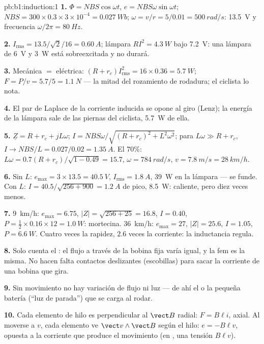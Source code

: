 \begin{solution}{pb:b1:induction:1}
\textbf{1.} $\Phi = NBS\cos\omega t$, $e = NBS\omega\sin\omega t$; $NBS = 300 \times
0.3 \times 3 \times 10^{-4} = \qty{0.027}{Wb}$; $\omega = v/r = 5/0.01 = \qty{500}{rad/s}$:
 \qty{13.5}{V} y frecuencia $\omega/2\pi = \qty{80}{Hz}$.

\textbf{2.} $I_{\text{rms}} = 13.5/\sqrt2/16 = \qty{0.60}{A}$; lámpara $RI^2 = \qty{4.3}{W}$
bajo \qty{7.2}{V}: una lámpara de \qty{6}{V} y \qty{3}{W} está sobreexcitada y no
durará.

\textbf{3.} Mecánica $=$ eléctrica: $(R + r_c)I_{\text{rms}}^2 = 16 \times 0.36 =
\qty{5.7}{W}$; $F = P/v = 5.7/5 = \qty{1.1}{N}$ --- la mitad del rozamiento de
rodadura; el ciclista lo nota.

\textbf{4.} El par de Laplace de la corriente inducida se opone al giro
(Lenz); la energía de la lámpara sale de las piernas del ciclista, \qty{5.7}{W} de ella.

\textbf{5.} $\underline Z = R + r_c + jL\omega$; $I = NBS\omega/\sqrt{(R + r_c)^2 + L^2\omega^2}$;
para $L\omega \gg R + r_c$, $I \to NBS/L = 0.027/0.02 = \qty{1.35}{A}$. El $70\%$: $L\omega
= 0.7(R + r_c)/\sqrt{1 - 0.49} = 15.7$, $\omega = \qty{784}{rad/s}$, $v = \qty{7.8}{m/s}
= \qty{28}{km/h}$.

\textbf{6.} Sin $L$: $e_{\max} = 3 \times 13.5 = \qty{40.5}{V}$, $I_{\text{rms}} =
\qty{1.8}{A}$, \qty{39}{W} en la lámpara --- se funde. Con $L$: $I = 40.5/\sqrt{256 +
900} = \qty{1.2}{A}$ de pico, \qty{8.5}{W}: caliente, pero diez veces menos.

\textbf{7.} \qty{9}{km/h}: $e_{\max} = 6.75$, $|Z| = \sqrt{256 + 25} = 16.8$, $I = 0.40$,
$P = \tfrac12 \times 0.16 \times 12 = \qty{1.0}{W}$: mortecina. \qty{36}{km/h}: $e_{\max} = 27$,
$|Z| = 25.6$, $I = 1.05$, $P = \qty{6.6}{W}$. Cuatro veces la rapidez, $2.6$ veces
la corriente: la inductancia regula.

\textbf{8.} Solo cuenta el : el flujo a través de la
bobina fija varía igual, y la fem es la misma. No hacen falta contactos
deslizantes (escobillas) para sacar la corriente de una bobina que gira.

\textbf{9.} Sin movimiento no hay variación de flujo ni luz --- de ahí el
 o la pequeña batería (``luz de parada'') que se carga al rodar.

\textbf{10.} Cada elemento de hilo es perpendicular al $\vect B$ radial:
$F = B\ell i$, axial. Al moverse a $v$, cada elemento ve $\vect v\wedge\vect B$
según el hilo: $e = -B\ell v$, opuesta a la corriente que produce el
movimiento (en , una tensión $B\ell v$).


\end{solution}
